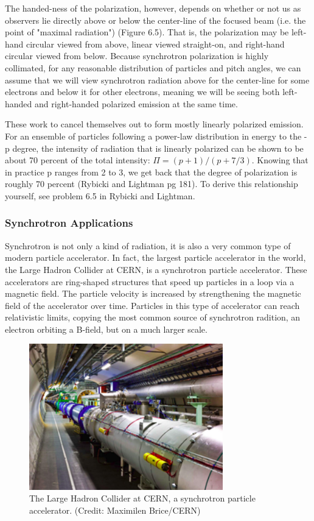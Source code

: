 \documentclass{article}
\begin{document}
The handed-ness of the polarization, however, depends on whether or not us as observers lie directly above or below the center-line of the focused beam (i.e. the point of "maximal radiation") (Figure 6.5). That is, the polarization may be left-hand circular viewed from above, linear viewed straight-on, and right-hand circular viewed from below. Because synchrotron polarization is highly collimated, for any reasonable distribution of particles and pitch angles, we can assume that we will view synchrotron radiation above for the center-line for some electrons and below it for other electrons, meaning we will be seeing both left-handed and right-handed polarized emission at the same time.

These work to cancel themselves out to form mostly linearly polarized emission. For an ensemble of particles following a power-law distribution in energy to the - p degree, the intensity of radiation that is linearly polarized can be shown to be about 70 percent of the total intensity: $\Pi = (p+1) / (p + 7/3)$. Knowing that in practice p ranges from 2 to 3, we get back that the degree of polarization is roughly 70 percent (Rybicki and Lightman pg 181). To derive this relationship yourself, see problem 6.5 in Rybicki and Lightman.

\subsubsection{Synchrotron Applications}

Synchrotron is not only a kind of radiation, it is also a very common type of modern particle accelerator. In fact, the largest particle accelerator in the world, the Large Hadron Collider at CERN, is a synchrotron particle accelerator. These accelerators are ring-shaped structures that speed up particles in a loop via a magnetic field. The particle velocity is increased by strengthening the magnetic field of the accelerator over time. Particles in this type of accelerator can reach relativistic limits, copying the most common source of synchrotron radition, an electron orbiting a B-field, but on a much larger scale.


\begin{figure}
    \centering
    \includegraphics[width=0.75\textwidth]{250px-Lhc.png}
    \caption{The Large Hadron Collider at CERN, a synchrotron particle accelerator. (Credit: Maximilen Brice/CERN)}
    \label{fig:LHC.}
\end{figure}
\end{document}
